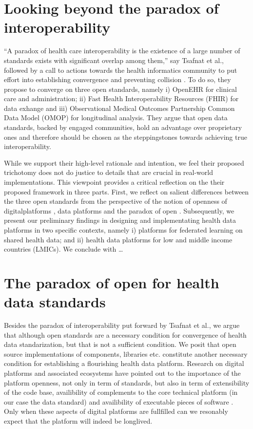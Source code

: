 \documentclass[
  authoryear]{elsarticle}
\begin{document}
\section{Looking beyond the paradox of
interoperability}\label{looking-beyond-the-paradox-of-interoperability}

``A paradox of health care interoperability is the existence of a large
number of standards exists with significant overlap among them,'' say
Tsafnat et al., followed by a call to actions towards the health
informatics community to put effort into establishing convergence and
preventing collision \citep{tsafnat2024converge}. To do so, they propose
to converge on three open standards, namely i) OpenEHR for clinical care
and administration; ii) Fast Health Interoperability Resources (FHIR)
for data exhange and iii) Observational Medical Outcomes Partnership
Common Data Model (OMOP) for longitudinal analysis. They argue that open
data standards, backed by engaged communities, hold an advantage over
proprietary ones and therefore should be chosen as the steppingstones
towards achieving true interoperability.

While we support their high-level rationale and intention, we feel their
proposed trichotomy does not do justice to details that are crucial in
real-world implementations. This viewpoint provides a critical
reflection on the their proposed framework in three parts. First, we
reflect on salient differences between the three open standards from the
perspective of the notion of openness of digitalplatforms
\citep{dereuver2018digital}, data platforms \citep{dereuver2022openness}
and the paradox of open \citep{keller2021paradox}. Subsequently, we
present our preliminary findings in designing and implementating health
data platforms in two specific contexts, namely i) platforms for
federated learning on shared health data; and ii) health data platforms
for low and middle income countries (LMICs). We conclude with \ldots{}

\section{The paradox of open for health data
standards}\label{the-paradox-of-open-for-health-data-standards}

Besides the paradox of interoperability put forward by Tsafnat et al.,
we argue that although open standards are a necessary condition for
convergence of health data standarization, but that is not a sufficient
condition. We posit that open source implementations of components,
libraries etc. constitute another necessary condition for establishing a
flourishing health data platform. Research on digital platforms and
associated ecosystems have pointed out to the importance of the platform
openness, not only in term of standards, but also in term of
extensibility of the code base, availibility of complements to the core
technical platform (in our case the data standard) and availibility of
executable pieces of software \citep{dereuver2018digital}. Only when
these aspects of digital platforms are fullfilled can we resonably
expect that the platform will indeed be longlived.
\end{document}
